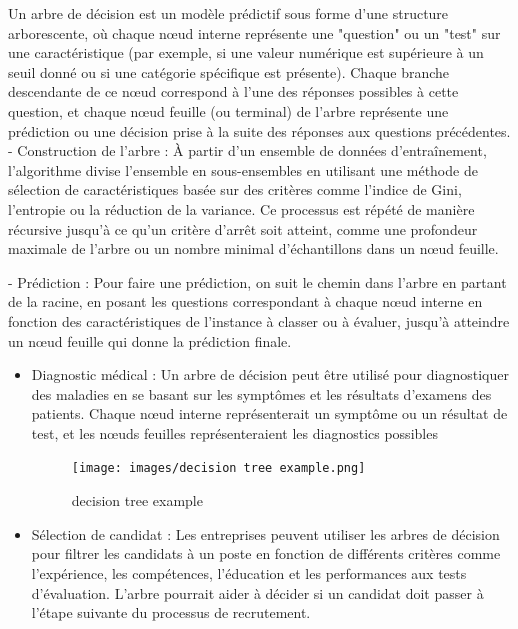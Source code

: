 \documentclass[a4paper,12pt]{article}
\begin{document}


            Un arbre de décision est un modèle prédictif sous forme d'une structure arborescente, où chaque nœud interne représente une "question" ou un "test" sur une caractéristique (par exemple, si une valeur numérique est supérieure à un seuil donné ou si une catégorie spécifique est présente). Chaque branche descendante de ce nœud correspond à l'une des réponses possibles à cette question, et chaque nœud feuille (ou terminal) de l'arbre représente une prédiction ou une décision prise à la suite des réponses aux questions précédentes. 
            - Construction de l'arbre : À partir d'un ensemble de données d'entraînement, l'algorithme divise l'ensemble en sous-ensembles en utilisant une méthode de sélection de caractéristiques basée sur des critères comme l'indice de Gini, l'entropie ou la réduction de la variance. Ce processus est répété de manière récursive jusqu'à ce qu'un critère d'arrêt soit atteint, comme une profondeur maximale de l'arbre ou un nombre minimal d'échantillons dans un nœud feuille.
            
            - Prédiction : Pour faire une prédiction, on suit le chemin dans l'arbre en partant de la racine, en posant les questions correspondant à chaque nœud interne en fonction des caractéristiques de l'instance à classer ou à évaluer, jusqu'à atteindre un nœud feuille qui donne la prédiction finale.
            

            \begin{itemize}
                \item Diagnostic médical : Un arbre de décision peut être utilisé pour diagnostiquer des maladies en se basant sur les symptômes et les résultats d'examens des patients. Chaque nœud interne représenterait un symptôme ou un résultat de test, et les nœuds feuilles représenteraient les diagnostics possibles

                 \begin{figure}[h]
                    \centering
                    \texttt{[image: images/decision tree example.png]}
                    \caption{decision tree example}
                    \label{fig:decision tree example}
                \end{figure}
                \item Sélection de candidat : Les entreprises peuvent utiliser les arbres de décision pour filtrer les candidats à un poste en fonction de différents critères comme l'expérience, les compétences, l'éducation et les performances aux tests d'évaluation. L'arbre pourrait aider à décider si un candidat doit passer à l'étape suivante du processus de recrutement.
            \end{itemize}
            
\end{document}
